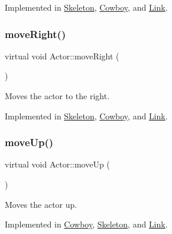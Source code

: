 Implemented in \mbox{\hyperlink{classSkeleton_ab03c65cdabc94f280443691653112d3a}{Skeleton}}, \mbox{\hyperlink{classCowboy_a487cf6b5d1e37586e6e9b408d2aaad1a}{Cowboy}}, and \mbox{\hyperlink{classLink_a682bab2dc3f967e35a67dcc74c1d4722}{Link}}.

\mbox{\label{classActor_a9176d8f8ec68fcbd91c48223e7c65775}} 
\subsubsection{\texorpdfstring{moveRight()}{moveRight()}}
{\footnotesize\ttfamily virtual void Actor\+::move\+Right (\begin{DoxyParamCaption}{ }\end{DoxyParamCaption})\hspace{0.3cm}{\ttfamily [pure virtual]}}



Moves the actor to the right. 



Implemented in \mbox{\hyperlink{classSkeleton_a3d8ce7b8a1d10e4a33a27f0eee54042e}{Skeleton}}, \mbox{\hyperlink{classCowboy_a2094d31b2535a25ef8a40945473cf884}{Cowboy}}, and \mbox{\hyperlink{classLink_aa1d60136a88be20a14179a5760ed91da}{Link}}.

\mbox{\label{classActor_afaa299f90233461ee4df96dcfda3008a}} 
\subsubsection{\texorpdfstring{moveUp()}{moveUp()}}
{\footnotesize\ttfamily virtual void Actor\+::move\+Up (\begin{DoxyParamCaption}{ }\end{DoxyParamCaption})\hspace{0.3cm}{\ttfamily [pure virtual]}}



Moves the actor up. 



Implemented in \mbox{\hyperlink{classCowboy_a3c4b0540c47492d02fa64b4740a35bcf}{Cowboy}}, \mbox{\hyperlink{classSkeleton_a0ddbea7574ada0b5cef0cadbd4a0dd9f}{Skeleton}}, and \mbox{\hyperlink{classLink_a850a1e6c7a68d921b36d30dc918a7668}{Link}}.

